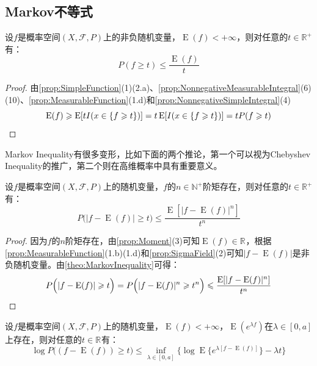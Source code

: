 \subsection{Markov不等式}
\begin{theorem}\label{theo:MarkovInequality}
	设$f$是概率空间$(X,\mathscr{F},P)$上的非负随机变量，$\operatorname{E}(f)<+\infty$，则对任意的$t\in\mathbb{R}^{+}$有：
	\begin{equation*}
		P(f\geqslant t)\leqslant\frac{\operatorname{E}(f)}{t}
	\end{equation*}
\end{theorem}
\begin{proof}
	由\cref{prop:SimpleFunction}(1)(2.a)、\cref{prop:NonnegativeMeasurableIntegral}(6)(10)、\cref{prop:MeasurableFunction}(1.d)和\cref{prop:NonnegativeSimpleIntegral}(4)
	\begin{equation*}
		\operatorname{E}(f)\geqslant\operatorname{E}[tI(x\in\{f\geqslant t\})]=t\operatorname{E}[I(x\in\{f\geqslant t\})]=tP(f\geqslant t)\qedhere
	\end{equation*}
\end{proof}
\begin{note}
	Markov Inequality有很多变形，比如下面的两个推论，第一个可以视为Chebyshev Inequality的推广，第二个则在高维概率中具有重要意义。
\end{note}
\begin{corollary}\label{cor:ChebyshevInequality}
	设$f$是概率空间$(X,\mathscr{F},P)$上的随机变量，$f$的$n\in\mathbb{N}^+$阶矩存在，则对任意的$t\in\mathbb{R}^{+}$有：
	\begin{equation*}
		P\Big(|f-\operatorname{E}(f)|\geqslant t\Big)\leqslant\frac{\operatorname{E}[|f-\operatorname{E}(f)|^n]}{t^n}
	\end{equation*}
\end{corollary}
\begin{proof}
	因为$f$的$n$阶矩存在，由\cref{prop:Moment}(3)可知$\operatorname{E}(f)\in\mathbb{R}^{}$，根据\cref{prop:MeasurableFunction}(1.b)(1.d)和\cref{prop:SigmaField}(2)可知$|f-\operatorname{E}(f)|$是非负随机变量。由\cref{theo:MarkovInequality}可得：
	\begin{equation*}
		P\Big(|f-\operatorname{E}(f)|\geqslant t\Big)=P\Big(|f-\operatorname{E}(f)|^n\geqslant t^n\Big)\leqslant\frac{\operatorname{E}[|f-\operatorname{E}(f)|^n]}{t^n}\qedhere
	\end{equation*}
\end{proof}
\begin{corollary}\label{cor:ChernoffBound}
	设$f$是概率空间$(X,\mathscr{F},P)$上的随机变量，$\operatorname{E}(f)<+\infty$，$\operatorname{E}(e^{\lambda f})$在$\lambda\in[0,a]$上存在，则对任意的$t\in\mathbb{R}^{}$有：
	\begin{equation*}
		\log P\Big((f-\operatorname{E}(f))\geqslant t\Big)\leqslant\inf_{\lambda\in[0,a]}\Big\{\log\operatorname{E}\{e^{\lambda[f-\operatorname{E}(f)]}\}-\lambda t\Big\}
	\end{equation*}
\end{corollary}

